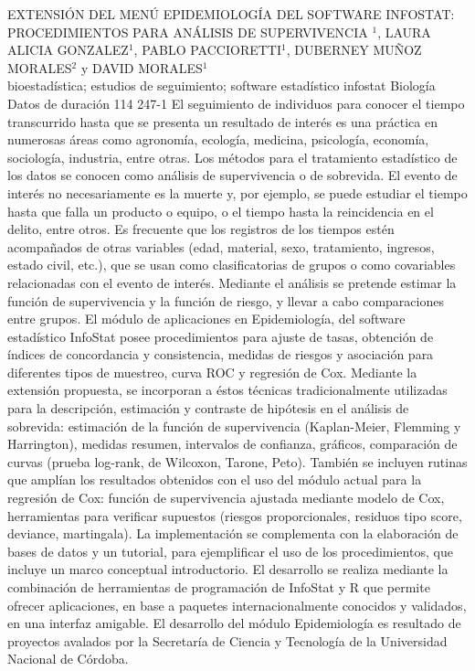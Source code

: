 \A
{EXTENSIÓN DEL MENÚ EPIDEMIOLOGÍA DEL SOFTWARE INFOSTAT: PROCEDIMIENTOS PARA ANÁLISIS DE SUPERVIVENCIA}
{$^1$, LAURA ALICIA GONZALEZ$^1$, PABLO PACCIORETTI$^1$, DUBERNEY MUÑOZ MORALES$^2$ y DAVID MORALES$^1$}
{
\\}
{bioestadística; estudios de seguimiento; software estadístico infostat} 
 {Biología} 
 {Datos de duración} 
 {114} 
 {247-1}
{El seguimiento de individuos para conocer el tiempo transcurrido hasta que se presenta un resultado de interés es una práctica en numerosas áreas como agronomía, ecología, medicina, psicología, economía, sociología, industria, entre otras. Los métodos para el tratamiento estadístico de los datos se conocen como análisis de supervivencia o de sobrevida. El evento de interés no necesariamente es la muerte y, por ejemplo, se puede estudiar el tiempo hasta que falla un producto o equipo, o el tiempo hasta la reincidencia en el delito, entre otros. Es frecuente que los registros de los tiempos estén acompañados de otras variables (edad, material, sexo, tratamiento, ingresos, estado civil, etc.), que se usan como clasificatorias de grupos o como covariables relacionadas con el evento de interés. Mediante el análisis se pretende estimar la función de supervivencia y la función de riesgo, y llevar a cabo comparaciones entre grupos. El módulo de aplicaciones en Epidemiología, del software estadístico InfoStat posee procedimientos para ajuste de tasas, obtención de índices de concordancia y consistencia, medidas de riesgos y asociación para diferentes tipos de muestreo, curva ROC y regresión de Cox. Mediante la extensión propuesta, se incorporan a éstos técnicas tradicionalmente utilizadas para la descripción, estimación y contraste de hipótesis en el análisis de sobrevida: estimación de la función de supervivencia (Kaplan-Meier, Flemming y Harrington), medidas resumen, intervalos de confianza, gráficos, comparación de curvas (prueba log-rank, de Wilcoxon, Tarone, Peto). También se incluyen rutinas que amplían los resultados obtenidos con el uso del módulo actual para la regresión de Cox: función de supervivencia ajustada mediante modelo de Cox, herramientas para verificar supuestos (riesgos proporcionales, residuos tipo score, deviance, martingala). La implementación se complementa con la elaboración de bases de datos y un tutorial, para ejemplificar el uso de los procedimientos, que incluye un marco conceptual introductorio. El desarrollo se realiza mediante la combinación de herramientas de programación de InfoStat y R que permite ofrecer aplicaciones, en base a paquetes internacionalmente conocidos y validados, en una interfaz amigable. El desarrollo del módulo Epidemiología es resultado de proyectos avalados por la Secretaría de Ciencia y Tecnología de la Universidad Nacional de Córdoba. }
